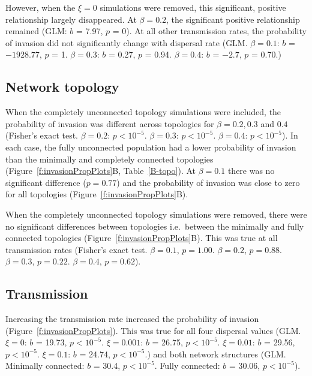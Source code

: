 However, when the $\xi = 0$ simulations were removed, this significant, positive relationship largely disappeared.
At $\beta = 0.2$, the significant positive relationship remained (GLM: $b$ = 7.97, $p$ = 0).
At all other transmission rates, the probability of invasion did not significantly change with dispersal rate (GLM. $\beta = 0.1$: $b$ = \ensuremath{-1928.77}, $p$ = 1. $\beta = 0.3$: $b$ = 0.27, $p$ = 0.94. $\beta = 0.4$: $b$ = \ensuremath{-2.7}, $p$ = 0.70.)


\subsection{Network topology}

When the completely unconnected topology simulations were included, the probability of invasion was different across topologies for $\beta = 0.2, 0.3$ and $0.4$ (Fisher's exact test. $\beta = 0.2$:  $p < 10^{-5}$. $\beta = 0.3$: $p < 10^{-5}$. $\beta = 0.4$:  $p < 10^{-5}$).
In each case, the fully unconnected population had a lower probability of invasion than the minimally and completely connected topologies (Figure~\ref{f:invasionPropPlots}B, Table~\ref{B-topo}).
At $\beta = 0.1$ there was no significant difference ($p = 0.77$) and the probability of invasion was close to zero for all topologies (Figure~\ref{f:invasionPropPlots}B).

When the completely unconnected topology simulations were removed, there were no significant differences between topologies i.e.\ between the minimally and fully connected topologies (Figure~\ref{f:invasionPropPlots}B). 
This was true at all transmission rates (Fisher's exact test. $\beta = 0.1$, $p = 1.00$. $\beta = 0.2$,  $p = 0.88$. $\beta = 0.3$, $p = 0.22$. $\beta = 0.4$,  $p = 0.62$).



\subsection{Transmission}

Increasing the transmission rate increased the probability of invasion (Figure~\ref{f:invasionPropPlots}).
This was true for all four dispersal values (GLM. $\xi = 0$: $b$ = 19.73, $p < 10^{-5}$. $\xi = 0.001$: $b$ = 26.75, $p < 10^{-5}$. $\xi = 0.01$: $b$ = 29.56, $p < 10^{-5}$. $\xi = 0.1$: $b$ = 24.74, $p < 10^{-5}$.) and both network structures (GLM. Minimally connected: $b$ = 30.4, $p < 10^{-5}$. Fully connected: $b$ = 30.06, $p < 10^{-5}$).








